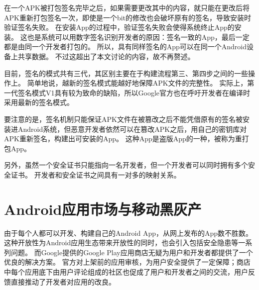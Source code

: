 %

在一个APK被打包签名完毕之后，如果需要更改其中的内容，就只能在更改后将APK重新打包签名一次，即使是一个bit的修改也会破坏原有的签名，导致安装时验证签名失败。
在安装App的过程中，验证签名失败会使得系统终止App的安装。
这也是系统可以用数字签名识别开发者的原因：签名一致的App，最后一定都是由同一个开发者打包的。
所以，具有同样签名的App可以在同一个Android设备上共享数据。
不过这超出了本文讨论的内容，故不再赘述。

目前，签名的模式共有三代，其区别主要在于构建流程第三、第四步之间的一些操作上。
简单地说，越新的签名模式能越好地保障APK文件的完整性。
实际上，第一代签名模式V1具有较为致命的缺陷，所以Google官方也在呼吁开发者在编译时采用最新的签名模式。

要注意的是，签名机制只能保证APK文件在被篡改之后不能凭借原有的签名被安装进Android系统，但恶意开发者依然可以在篡改APK之后，用自己的密钥库对APK重新签名，构建出可安装的App。
这种App是盗版App的一种，被称为重打包App。

另外，虽然一个安全证书只能指向一名开发者，但一个开发者可以同时拥有多个安全证书。
开发者和安全证书之间具有一对多的映射关系。

\section{Android应用市场与移动黑灰产}
\label{sec:androidMkt}

由于每个人都可以开发、构建自己的Android App，从网上发布的App数不胜数。这种开放性为Android应用生态带来开放性的同时，也会引入包括安全隐患等一系列问题。
而Google提供的Google Play应用商店无疑为用户和开发者都提供了一个优良的解决方案。
官方对上架前的应用审核，为用户安全提供了一定保障；商店中每个应用底下由用户评论组成的社区也促成了用户和开发者之间的交流，用户反馈直接推动了开发者对应用的改良。

